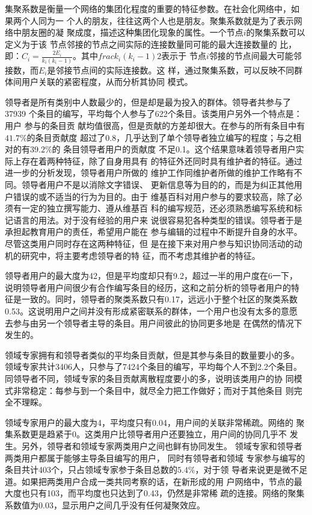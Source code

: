 集聚系数是衡量一个网络的集团化程度的重要的特征参数。在社会化网络中，如
果两个人同为一
个人的朋友，往往这两个人也是朋友。聚集系数就是为了表示网络中朋友圈的凝
聚成度，描述这种集团化现象的属性。一个节点$i$的聚集系数可以定义为于该
节点邻接的节点之间实际的连接数量同可能的最大连接数量的
比，即：$C_i=\frac{2E_i}{k_i(k_i-1)}$。其中$frac{k_i(k_i-1)}{2}$表示于
节点$i$邻接的节点间最大可能邻接数，而$E_i$是邻接节点间的实际连接数。这
样，通过聚集系数，可以反映不同群体间用户关联的紧密程度，从而分析其协同
模式。

领导者是所有类别中人数最少的，但是却是最为投入的群体。领导者共参与了37939
个条目的编写，平均每个人参与了622个条目。该类用户另外一个特点是：用户
参与的条目贡
献均值很高，但是贡献的方差却很大。在参与的所有条目中有$41.7\%$的条目贡献度
超过了0.8，几乎达到了单个领导者独立编写的程度；与之相对的有$39.2\%$的
条目领导者用户的贡献度
不足0.1。这个结果意味着领导者用户实际上存在着两种特征，除了自身用具有
的特征外还同时具有维护者的特征。通过进一步的分析发现，领导者用户所做的
维护工作同维护者所做的维护工作略有不同。领导者用户不是以消除文字错误、
更新信息等为目的的，而是为纠正其他用户错误的或不适当的行为为目的。由于
维基百科对用户参与的要求较高，除了必须有一定的独立撰写能力、遵从维基百
科的编写规范，还必须熟悉编写系统和标记语言的用法。对于没有经验的用户来
说很容易犯各种类型的错误。领导者于是承担起教育用户的责任，希望用户能在
参与编辑的过程中不断提升自身的水平。尽管这类用户同时存在这两种特征，但
是在接下来对用户参与知识协同活动的动机的研究中，将主要考虑领导者的特
征，而不考虑其维护者的特征。

领导者用户的最大度为42，但是平均度却只有9.2，超过一半的用户度在6一下，
说明领导者用户间很少有合作编写条目的经历，这和之前分析的领导者用户的特
征是一致的。同时，领导者的聚类系数只有0.17，远远小于整个社区的聚类系数
0.53。这说明用户之间并没有形成紧密联系的群体，一个用户也没有太多的意愿
去参与由另一个领导者主导的条目。用户间彼此的协同更多地是
在偶然的情况下发生的。

领域专家拥有和领导者类似的平均条目贡献，但是其参与条目的数量要小的多。
领域专家共计3406人，只参与了7424个条目的编写，平均每个人不到2.2个条目。
同领导者不同，领域专家的条目贡献离散程度要小的多，说明该类用户的协
同模式非常稳定：每参与到一个条目中，就尽全力把工作做好；而对于其他条目
则完全不理睬。

领域专家用户的最大度为4，平均度只有0.04，用户间的关联非常稀疏。网络的
聚集系数更是趋紧于0。这类用户比领导者用户还要独立，用户间的协同几乎不
发生。另外，领导者和领域专家两类用户之间也鲜有协同发生。
领域专家和领导者两类用户都属于能够主导条目编写的用户，
同时有领导者和领域
专家参与编写的条目共计403个，只占领域专家参于条目总数的$5.4\%$，对于领
导者来说更是微不足道。如果把两类用户合成一类共同考察的话，在新形成的用
户网络中，节点的最大度也只有103，而平均度也只达到了0.43，仍然是非常稀
疏的连接。网络的聚集系数值为0.03，显示用户之间几乎没有任何凝聚效应。

